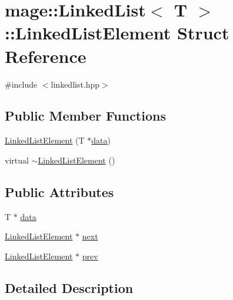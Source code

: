\hypertarget{structmage_1_1_linked_list_1_1_linked_list_element}{}\section{mage\+:\+:Linked\+List$<$ T $>$\+:\+:Linked\+List\+Element Struct Reference}
\label{structmage_1_1_linked_list_1_1_linked_list_element}


{\ttfamily \#include $<$linkedlist.\+hpp$>$}

\subsection*{Public Member Functions}
\begin{DoxyCompactItemize}
\item 
\hyperlink{structmage_1_1_linked_list_1_1_linked_list_element_a7bb2d9bd1aef7790f675a09a607f4160}{Linked\+List\+Element} (T $\ast$\hyperlink{structmage_1_1_linked_list_1_1_linked_list_element_a7db014fd56a2bffd6dab7f52f1b30687}{data})
\item 
virtual \hyperlink{structmage_1_1_linked_list_1_1_linked_list_element_a89ff38c90ddf8854abb821d1497e8e1c}{$\sim$\+Linked\+List\+Element} ()
\end{DoxyCompactItemize}
\subsection*{Public Attributes}
\begin{DoxyCompactItemize}
\item 
T $\ast$ \hyperlink{structmage_1_1_linked_list_1_1_linked_list_element_a7db014fd56a2bffd6dab7f52f1b30687}{data}
\item 
\hyperlink{structmage_1_1_linked_list_1_1_linked_list_element}{Linked\+List\+Element} $\ast$ \hyperlink{structmage_1_1_linked_list_1_1_linked_list_element_a379ce1f54d7a044cdfd97595460ac602}{next}
\item 
\hyperlink{structmage_1_1_linked_list_1_1_linked_list_element}{Linked\+List\+Element} $\ast$ \hyperlink{structmage_1_1_linked_list_1_1_linked_list_element_a6aa1a290fa0c06efae90730220bb4c57}{prev}
\end{DoxyCompactItemize}


\subsection{Detailed Description}
